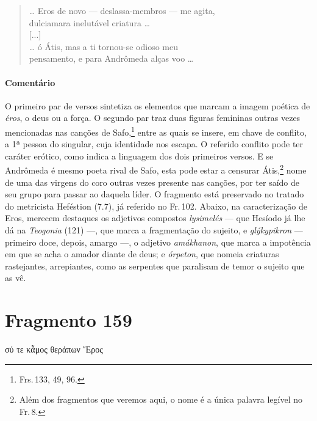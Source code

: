 \begin{verse}
\ldots{} Eros de novo --- deslassa-membros --- me agita,\\
dulciamara inelutável criatura \ldots{}\\[2mm]

\hspace*{22mm}[...]\\[2mm]

\ldots{} ó Átis, mas a ti tornou-se odioso meu\\
pensamento, e para Andrômeda alças voo \ldots{}
\end{verse}


{\paragraph{Comentário} O primeiro par de versos sintetiza os elementos que marcam a imagem poética de
\emph{éros}, o deus ou a força. O segundo par traz duas figuras femininas
outras vezes mencionadas nas canções de Safo,\footnote{Frs.\,133, 49, 96.} entre
as quais se insere, em chave de conflito, a 1ª pessoa do singular, cuja
identidade nos escapa. O referido conflito pode ter caráter
erótico, como indica a linguagem dos dois primeiros versos. E se Andrômeda é mesmo poeta rival de Safo, esta pode estar a censurar Átis,\footnote{Além dos fragmentos que veremos aqui, o nome é a única palavra legível no Fr.\,8.} nome de uma das virgens do coro outras vezes presente nas canções, por ter saído de seu grupo para passar ao daquela líder. O fragmento está preservado no tratado do metricista Heféstion (7.7), já
referido no Fr.\,102.
Abaixo, na caracterização de Eros, merecem destaques os adjetivos  compostos \emph{lysimelés} --- que Hesíodo já lhe dá na \emph{Teogonia} (121) ---, que marca a fragmentação do sujeito, e \emph{glýkypikron} --- primeiro doce, depois, amargo ---, o adjetivo \emph{amákhanon}, que marca a impotência em que se acha o amador diante de deus; e \emph{órpeton}, que nomeia criaturas rastejantes, arrepiantes, como as serpentes que paralisam de temor o sujeito que as vê.}



\section{Fragmento 159}

\begin{gkverse}
σύ τε κἆμος θεράπων Ἔρος
\end{gkverse}

